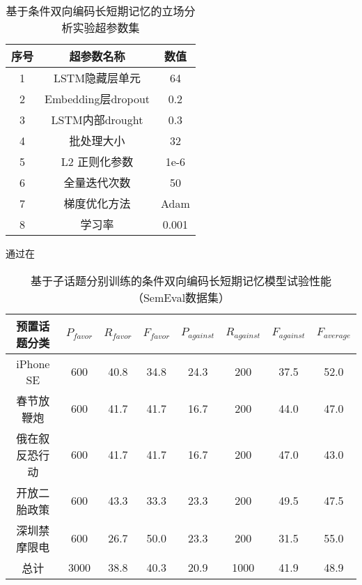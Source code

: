 \begin{table}[htbp]
	\caption[param]{基于条件双向编码长短期记忆的立场分析实验超参数集}
	\label{param}
	\vspace{0.5em}\centering\wuhao
	\begin{tabular}{ccc}
		\toprule[1.5pt]
		序号& 超参数名称 &数值\\
		\midrule[1pt]
		1 &LSTM隐藏层单元& 64\\
		2 &Embedding层dropout& 0.2\\
		3 &LSTM内部drought& 0.3\\
		4 &批处理大小& 32\\
		5 &L2 正则化参数 &1e-6\\
		6 &全量迭代次数& 50\\
		7 &梯度优化方法& Adam\\
		8 &学习率& 0.001\\
		\bottomrule[1.5pt]
	\end{tabular}
\end{table}

通过在
\begin{table}[htbp]
	\caption[table123]{基于子话题分别训练的条件双向编码长短期记忆模型试验性能（SemEval数据集）}
	\label{chinesedata}
	\vspace{0.5em}\centering\wuhao
	\begin{tabular}{cccccccc}
		\toprule[1.5pt]
		预置话题分类& $P_{favor}$&$R_{favor}$&$F_{favor}$&$P_{against}$&$R_{against}$&$F_{against}$&$F_{average}$ \\
		\midrule[1pt]
		iPhone SE&600&40.8&34.8&24.3&200&37.5&52.0\\
		春节放鞭炮&600&41.7&41.7&16.7&200&44.0&47.0\\
		俄在叙反恐行动&600&41.7&41.7&16.7&200&47.0&43.0\\
		开放二胎政策&600&43.3&33.3&23.3&200&49.5&47.5\\
		深圳禁摩限电&600&26.7&50.0&23.3&200&31.5&55.0\\
		总计&3000&38.8&40.3&20.9&1000&41.9&48.9\\
		\bottomrule[1.5pt]
	\end{tabular}
\end{table}

